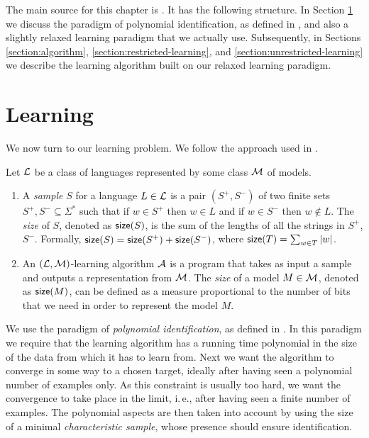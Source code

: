 The main source for this chapter is \citep{C12, C13, C15tech}. It has the following structure. In Section \ref{section:learning} we discuss the paradigm of polynomial identification, as defined in \citep{Gold78, delaHiguera1997}, and also a slightly relaxed learning paradigm that we actually use. Subsequently, in Sections \ref{section:algorithm}, \ref{section:restricted-learning}, and \ref{section:unrestricted-learning} we describe the learning algorithm built on our relaxed learning paradigm.

\section{Learning}\label{section:learning}

We now turn to our learning problem. We follow the approach used in \citep{Eyraud2007}.

\begin{definition}\label{definition:identification1}
Let $\textup{\sf $\mathcal{L}$}$ be a class of languages represented by some class $\textup{\sf $\mathcal{M}$}$ of models.
\begin{enumerate}
\item A \emph{sample} $S$ for a language $L \in \textup{\sf $\mathcal{L}$}$ is a pair $(S^+, S^-)$ of two finite sets $S^+, S^- \subseteq \Sigma^*$ such that if $w \in S^+$ then $w \in L$ and if $w \in S^-$ then $w \notin L$. The \emph{size} of $S$, denoted as $\textup{\sf size}(S)$, is the sum of the lengths of all the strings in $S^+$, $S^-$. Formally, $\textup{\sf size}(S) = \textup{\sf size}(S^+) + \textup{\sf size}(S^-)$, where $\textup{\sf size}(T) = \sum_{w \in T} |w|$.

\item An $(\textup{\sf $\mathcal{L}$}, \textup{\sf $\mathcal{M}$})$-learning algorithm $\textup{\sf $\mathcal{A}$}$ is a program that takes as input a sample and outputs a representation from $\textup{\sf $\mathcal{M}$}$. The \emph{size} of a model $M \in \textup{\sf $\mathcal{M}$}$, denoted as $\textup{\sf size}(M)$, can be defined as a measure proportional to the number of bits that we need in order to represent the model $M$.
\end{enumerate}
\end{definition}

We use the paradigm of \emph{polynomial identification}, as defined in \citep{Gold78, delaHiguera1997}. In this paradigm we require that the learning algorithm has a running time polynomial in the size of the data from which it has to learn from. Next we want the algorithm to converge in some way to a chosen target, ideally after having seen a polynomial number of examples only. As this constraint is usually too hard, we want the convergence to take place in the limit, i.\,e., after having seen a finite number of examples. The polynomial aspects are then taken into account by using the size of a minimal \emph{characteristic sample}, whose presence should ensure identification.


